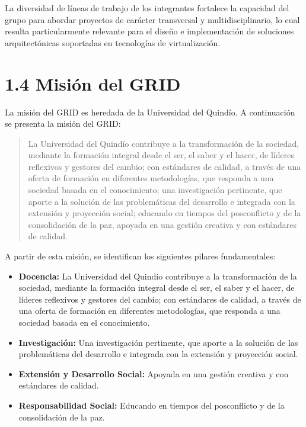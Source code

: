 La diversidad de líneas de trabajo de los integrantes fortalece la capacidad del grupo para abordar proyectos de carácter transversal y multidisciplinario, lo cual resulta particularmente relevante para el diseño e implementación de soluciones arquitectónicas soportadas en tecnologías de virtualización.

\section*{1.4 Misión del GRID}

La misión del GRID es heredada de la Universidad del Quindío. A continuación se presenta la misión del GRID:

\begin{quote}
La Universidad del Quindío contribuye a la transformación de la sociedad, mediante la formación integral desde el ser, el saber y el hacer, de líderes reflexivos y gestores del cambio; con estándares de calidad, a través de una oferta de formación en diferentes metodologías, que responda a una sociedad basada en el conocimiento; una investigación pertinente, que aporte a la solución de las problemáticas del desarrollo e integrada con la extensión y proyección social; educando en tiempos del posconflicto y de la consolidación de la paz, apoyada en una gestión creativa y con estándares de calidad.
\end{quote}

A partir de esta misión, se identifican los siguientes pilares fundamentales:

\begin{itemize}
    \item \textbf{Docencia:} La Universidad del Quindío contribuye a la transformación de la sociedad, mediante la formación integral desde el ser, el saber y el hacer, de líderes reflexivos y gestores del cambio; con estándares de calidad, a través de una oferta de formación en diferentes metodologías, que responda a una sociedad basada en el conocimiento.

    \item \textbf{Investigación:} Una investigación pertinente, que aporte a la solución de las problemáticas del desarrollo e integrada con la extensión y proyección social.

    \item \textbf{Extensión y Desarrollo Social:} Apoyada en una gestión creativa y con estándares de calidad.

    \item \textbf{Responsabilidad Social:} Educando en tiempos del posconflicto y de la consolidación de la paz.
\end{itemize}

